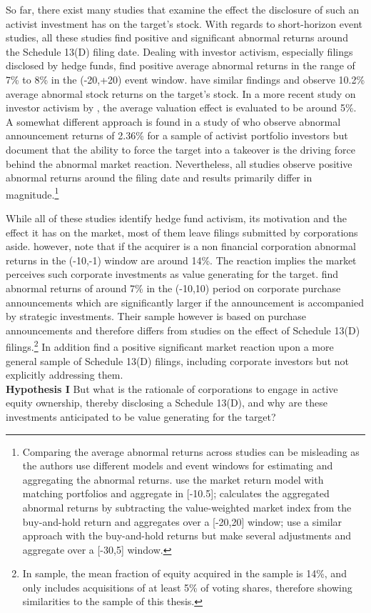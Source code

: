 \documentclass[12pt]{article}
\begin{document}
So far, there exist many studies that examine the effect the disclosure of such an activist investment has on the target's stock. With regards to short-horizon event studies, all these studies find positive and significant abnormal returns around the Schedule 13(D) filing date. 
Dealing with investor activism, especially filings disclosed by hedge funds, \citet[p.1730]{Brav2008} find positive average abnormal returns in the range of 7\% to 8\% in the (-20,+20) event window. \citet[p.188]{Klein2009} have similar findings and observe 10.2\% average abnormal stock returns on the target's stock. In a more recent study on investor activism by \citet[p.410]{Denes2017}, the average valuation effect is evaluated to be around 5\%. A somewhat different approach is found in a study of \citet[p.363]{Greenwood2009} who observe abnormal announcement returns of 2.36\% for a sample of activist portfolio investors but document that the ability to force the target into a takeover is the driving force behind the abnormal market reaction. Nevertheless, all studies observe positive abnormal returns around the filing date and results primarily differ in magnitude.\footnote{Comparing the average abnormal returns across studies can be misleading as the authors use different models and event windows for estimating and aggregating the abnormal returns. \citet{Greenwood2009} use the market return model with matching portfolios and aggregate in [-10.5]; \citet{Brav2008} calculates the aggregated abnormal returns by subtracting the value-weighted market index from the buy-and-hold return and aggregates over a [-20,20] window; \citet{Klein2009} use a similar approach with the buy-and-hold returns but make several adjustments and aggregate over a [-30,5] window.}

While all of these studies identify hedge fund activism, its motivation and the effect it has on the market, most of them leave filings submitted by corporations aside. \citet[p.29]{Brigida2012} however, note that if the acquirer is a non financial corporation abnormal returns in the (-10,-1) window are around 14\%. The reaction implies the market perceives such corporate investments as value generating for the target. \citet[p.2803]{Allen2000} find abnormal returns of around 7\% in the (-10,10) period on corporate purchase announcements which are significantly larger if the announcement is accompanied by strategic investments. Their sample however is based on purchase announcements and therefore differs from studies on the effect of Schedule 13(D) filings.\footnote{In \citet[p.2801]{Allen2000} sample, the mean fraction of equity acquired in the sample is 14\%, and  only includes acquisitions of at least 5\% of voting shares, therefore showing similarities to the sample of this thesis.} In addition \citet{Collin-Dufresne2015} find a positive significant market reaction upon a more general sample of Schedule 13(D) filings, including corporate investors but not explicitly addressing them.\\
\textbf{Hypothesis I}
But what is the rationale of corporations to engage in active equity ownership, thereby disclosing a Schedule 13(D), and why are these investments anticipated to be value generating for the target?
\end{document}
